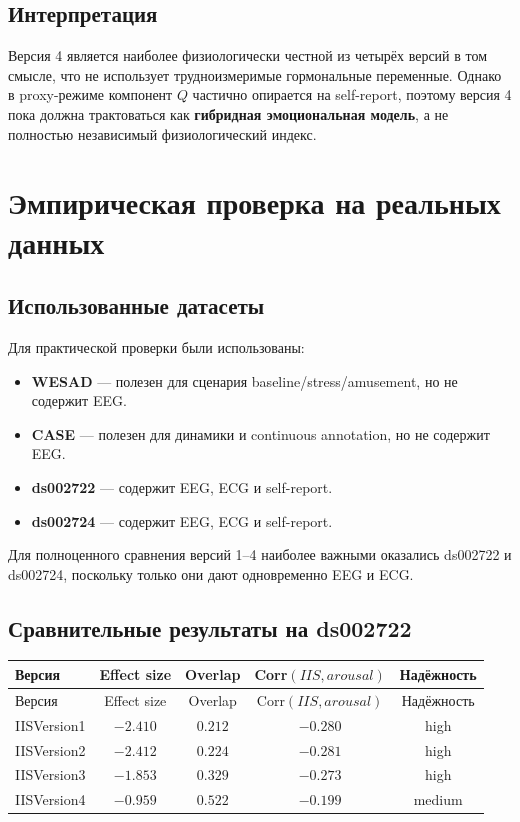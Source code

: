 \documentclass[12pt,a4paper]{article}
\begin{document}
\subsection{Интерпретация}
Версия 4 является наиболее физиологически честной из четырёх версий в том смысле, что не использует трудноизмеримые гормональные переменные. Однако в proxy-режиме компонент $Q$ частично опирается на self-report, поэтому версия 4 пока должна трактоваться как \textbf{гибридная эмоциональная модель}, а не полностью независимый физиологический индекс.

\section{Эмпирическая проверка на реальных данных}
\subsection{Использованные датасеты}
Для практической проверки были использованы:
\begin{itemize}[leftmargin=1.25cm]
    \item \textbf{WESAD} --- полезен для сценария baseline/stress/amusement, но не содержит EEG.
    \item \textbf{CASE} --- полезен для динамики и continuous annotation, но не содержит EEG.
    \item \textbf{ds002722} --- содержит EEG, ECG и self-report.
    \item \textbf{ds002724} --- содержит EEG, ECG и self-report.
\end{itemize}

Для полноценного сравнения версий 1--4 наиболее важными оказались ds002722 и ds002724, поскольку только они дают одновременно EEG и ECG.

\subsection{Сравнительные результаты на ds002722}
\begin{longtable}{>{\raggedright\arraybackslash}p{2.6cm}cccc}
\toprule
Версия & Effect size & Overlap & Corr$(IIS, arousal)$ & Надёжность \\
\midrule
\endfirsthead
\toprule
Версия & Effect size & Overlap & Corr$(IIS, arousal)$ & Надёжность \\
\midrule
\endhead
IISVersion1 & $-2.410$ & $0.212$ & $-0.280$ & high \\
IISVersion2 & $-2.412$ & $0.224$ & $-0.281$ & high \\
IISVersion3 & $-1.853$ & $0.329$ & $-0.273$ & high \\
IISVersion4 & $-0.959$ & $0.522$ & $-0.199$ & medium \\
\bottomrule
\end{longtable}
\end{document}
